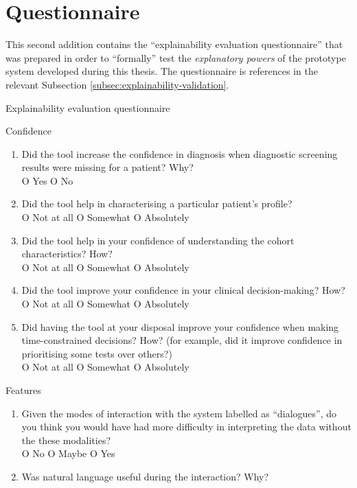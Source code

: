 \chapter{Questionnaire} \label{app:questionnaire}

This second addition contains the \enquote{explainability evaluation questionnaire} that was prepared in order to \enquote{formally} test the \textit{explanatory powers} of the prototype system developed during this thesis.
The questionnaire is references in the relevant Subsection \ref{subsec:explainability-validation}.

\begin{mdframed}
	\begin{center}
		{\huge Explainability evaluation questionnaire}
	\end{center}
	{\Large Confidence}
	\begin{enumerate} 
		\item Did the tool increase the confidence in diagnosis when diagnostic screening results were missing for a patient?  Why? \\
		O Yes O No
		\item Did the tool help in characterising a particular patient's profile? \\
		O Not at all O Somewhat O Absolutely
		\item Did the tool help in your confidence of understanding the cohort characteristics?  How? \\
		O Not at all O Somewhat O Absolutely
		\item Did the tool improve your confidence in your clinical decision-making?  How? \\ 
		O Not at all O Somewhat O Absolutely
		\item Did having the tool at your disposal improve your confidence when making time-constrained decisions?  How? (for example, did it improve confidence in prioritising some tests over others?) \\
		O Not at all O Somewhat O Absolutely
	\end{enumerate}
	{\Large Features}
	\begin{enumerate}[resume]
		\item Given the modes of interaction with the system labelled as \enquote{dialogues}, do you think you would have had more difficulty in interpreting the data without the these modalities? \\
		O No O Maybe O Yes
		\item Was natural language useful during the interaction?  Why? \\

\end{enumerate}
\end{mdframed}
